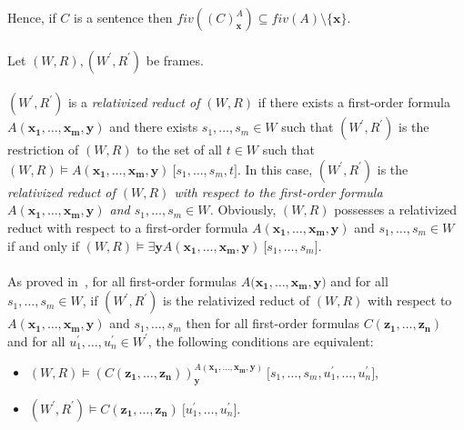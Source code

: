 \documentclass[draft]{article}
\begin{document}
Hence, if $C$ is a sentence then $fiv((C)_{\mathbf{x}}^{A})\subseteq fiv(A)\setminus\{\mathbf{x}\}$.
%
%
\\
\\
%
%
Let $(W,R),(W^{\prime},R^{\prime})$ be frames.
%
%
\\
\\
%
%
$(W^{\prime},R^{\prime})$ is a {\it relativized reduct of $(W,R)$}\/ if there exists a first-order formula $A(\mathbf{x_{1}},\ldots,\mathbf{x_{m}},\mathbf{y})$ and there exists $s_{1},\ldots,s_{m}{\in}W$ such that $(W^{\prime},R^{\prime})$ is the restriction of $(W,R)$ to the set of all $t{\in}W$ such that $(W,R)\models A(\mathbf{x_{1}},\ldots,\mathbf{x_{m}},\mathbf{y})\ \lbrack s_{1},\ldots,
%
%
%
%
%
%
%
%
%
%
%
%
$\linebreak$
%
%
%
%
%
%
%
%
%
%
%
%
s_{m},t\rbrack$.
In this case, $(W^{\prime},R^{\prime})$ is the {\it relativized reduct of $(W,R)$ with respect to the first-order formula $A(\mathbf{x_{1}},\ldots,\mathbf{x_{m}},\mathbf{y})$ and $s_{1},\ldots,s_{m}{\in}W$.}
Obviously, $(W,R)$ possesses a relativized reduct with respect to a first-order formula $A(\mathbf{x_{1}},\ldots,\mathbf{x_{m}},\mathbf{y})$ and $s_{1},\ldots,s_{m}{\in}W$ if and only if $(W,R)\models\exists\mathbf{y}A(\mathbf{x_{1}},\ldots,\mathbf{x_{m}},\mathbf{y})\ \lbrack s_{1},\ldots,s_{m}\rbrack$.
%
%
\\
\\
As proved in~\cite[Theorem $5.1.1$ at Page~$203$]{Hodges:1993}, for all first-order formulas $A(\mathbf{x_{1}},
%
%
%
%
%
%
%
%
%
%
%
%
$\linebreak$
%
%
%
%
%
%
%
%
%
%
%
%
\ldots,\mathbf{x_{m}},\mathbf{y})$ and for all $s_{1},\ldots,s_{m}{\in}W$, if $(W^{\prime},R^{\prime})$ is the relativized reduct of $(W,R)$ with respect to $A(\mathbf{x_{1}},\ldots,\mathbf{x_{m}},\mathbf{y})$ and $s_{1},\ldots,s_{m}$ then for all first-order formulas $C(\mathbf{z_{1}},\ldots,\mathbf{z_{n}})$ and for all $u^{\prime}_{1},\ldots,u^{\prime}_{n}{\in}W^{\prime}$, the following conditions are equivalent:
%
%
\begin{itemize}
%
%
\item $(W,R)\models(C(\mathbf{z_{1}},\ldots,\mathbf{z_{n}}))_{\mathbf{y}}^{A(\mathbf{x_{1}},\ldots,\mathbf{x_{m}},\mathbf{y})}\ \lbrack s_{1},\ldots,s_{m},u^{\prime}_{1},\ldots,u^{\prime}_{n}\rbrack$,
%
%
\item $(W^{\prime},R^{\prime})\models C(\mathbf{z_{1}},\ldots,\mathbf{z_{n}})\ \lbrack u^{\prime}_{1},\ldots,u^{\prime}_{n}\rbrack$.
%
%
\end{itemize}
\end{document}
